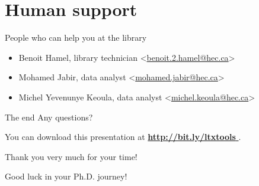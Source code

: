 \documentclass[aspectratio=1610,compress,t,gabaritb,french,english]{hecppt}
\newcommand{\HEClien}[2]{%
	\href{#1}{\textbf{#2} \faExternalLink}
}
\begin{document}
\section{Human support}

	\begin{frame}[c]{People who can help you at the library}
		\begin{itemize}
			\item Benoit Hamel, library technician <\href{mailto:benoit.2.hamel@hec.ca}{benoit.2.hamel@hec.ca}>
			\item Mohamed Jabir, data analyst <\href{mailto:mohamed.jabir@hec.ca}{mohamed.jabir@hec.ca}>
			\item Michel Yevenunye Keoula, data analyst <\href{mailto:michel.keoula@hec.ca}{michel.keoula@hec.ca}>
		\end{itemize}
	\end{frame}

	\begin{frame}[c]{The end}
		\centering
		Any questions? 
		
		You can download this presentation at \HEClien{http://bit.ly/ltxtools}{http://bit.ly/ltxtools}.
		
		Thank you very much for your time!
		
		Good luck in your Ph.D. journey!
	\end{frame}
\end{document}
